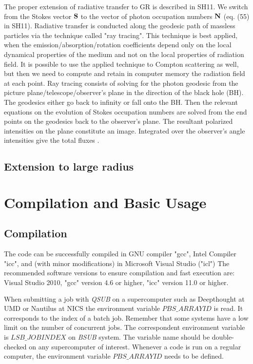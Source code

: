 \documentclass{emulateapj}
\begin{document}
The proper extension of radiative transfer to GR is described in SH11. We switch from the Stokes vector ${\bf S}$ to the vector of photon occupation numbers ${\bf N}$ (eq. (55) in SH11).
Radiative transfer is conducted along the geodesic path of massless particles via the technique called "ray tracing". This technique is best applied,
when the emission/absorption/rotation coefficients depend only on the local dynamical properties of the medium and not on the local properties of radiation field.
It is possible to use the applied technique to Compton scattering as well, but then we need to compute and retain in computer memory the radiation field at each point.
Ray tracing consists of solving for the photon geodesic from the picture plane/telescope/observer's plane in the direction of the black hole (BH).
The geodesics either go back to infinity or fall onto the BH. Then the relevant equations on the evolution of Stokes occupation numbers are solved from the end points
on the geodesics back to the observer's plane. The resultant polarized intensities on the plane constitute an image. Integrated over the observer's angle intensities
give the total fluxes \citep{Rybicki1979}.

\subsection{Extension to large radius}

\section{Compilation and Basic Usage}
\subsection{Compilation}
The code can be successfully compiled in GNU compiler "gcc", Intel Compiler "icc", and (with minor modifications) in Microsoft Visual Studio ("icl")
The recommended software versions to ensure compilation and fast execution are: Visual Studio 2010, "gcc" version 4.6 or higher, "icc" version 11.0 or higher.

When submitting a job with \textit{QSUB} on a supercomputer such as Deepthought at UMD or Nautilus at NICS
the environment variable $PBS\_ARRAYID$ is read. It corresponds to the index of a batch job.
Remember that some systems have a low limit on the number of concurrent jobs.
The correspondent environment variable is $LSB\_JOBINDEX$ on \textit{BSUB} system. The variable name should be double-checked on any supercomputer of interest.
Whenever a code is run on a regular computer, the environment variable $PBS\_ARRAYID$ needs to be defined.
\end{document}
